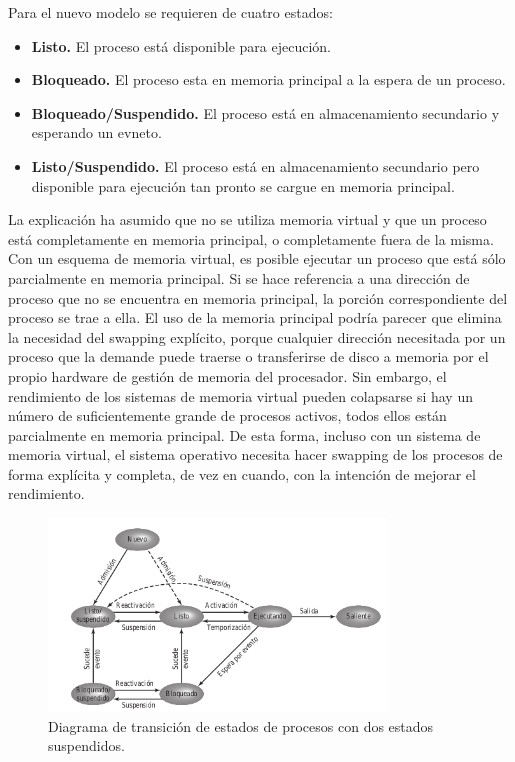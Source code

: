 \documentclass{article}
\begin{document}
				Para el nuevo modelo se requieren de cuatro estados: 
				\begin{itemize}
				\item \textbf{Listo.} El proceso está disponible para ejecución.
				\item \textbf{Bloqueado.} El proceso esta en memoria principal a la espera de un proceso.
				\item \textbf{Bloqueado/Suspendido.} El proceso está en almacenamiento secundario y esperando un evneto.
				\item \textbf{Listo/Suspendido.} El proceso está en almacenamiento secundario pero disponible para ejecución tan pronto se cargue en memoria principal.
				\end{itemize}
				
				La explicación ha asumido que no se utiliza memoria virtual y que un proceso está completamente en memoria principal, o completamente fuera de la misma. Con
un esquema de memoria virtual, es posible ejecutar un proceso que está sólo parcialmente en memoria principal. Si se hace referencia a una dirección de proceso que no se encuentra en memoria principal, la porción correspondiente del proceso se trae a ella. El uso de la memoria principal podría parecer que elimina la necesidad del swapping explícito, porque cualquier dirección necesitada por un
proceso que la demande puede traerse o transferirse de disco a memoria por el propio hardware de gestión de memoria del procesador. Sin embargo, el rendimiento de los sistemas de memoria virtual pueden colapsarse si hay un número de suficientemente grande de procesos activos, todos ellos están parcialmente en memoria principal. De esta forma, incluso con un sistema de memoria virtual, el sistema operativo necesita hacer swapping de los procesos de forma explícita y completa, de vez en cuando, con la intención de mejorar el rendimiento. \\
				
				\begin{figure}
				\caption{Diagrama de transición de estados de procesos con dos estados suspendidos.}
				\label{figura2.5:estadossuspendidos}
				\centering
				\includegraphics[width=0.8\textwidth, scale=1]{tema_2_figura5.png}
				\end{figure}
				
\end{document}
